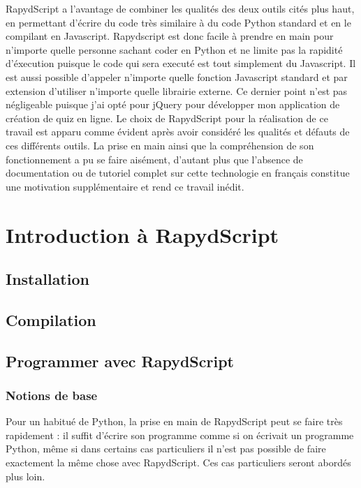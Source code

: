 \documentclass[letterpaper,10pt,french]{sphinxmanual}
\begin{document}
RapydScript a l'avantage de combiner les qualités des deux outils cités plus haut, en permettant d'écrire du code très similaire à du code Python standard et en le compilant en Javascript. Rapydscript est donc facile à prendre en main pour n'importe quelle personne sachant coder en Python et ne limite pas la rapidité d'éxecution puisque le code qui sera executé est tout simplement du Javascript. Il est aussi possible d'appeler n'importe quelle fonction Javascript standard et par extension d'utiliser n'importe quelle librairie externe. Ce dernier point n'est pas négligeable puisque j'ai opté pour jQuery pour développer mon application de création de quiz en ligne. Le choix de RapydScript pour la réalisation de ce travail est apparu comme évident après avoir considéré les qualités et défauts de ces différents outils. La prise en main ainsi que la compréhension de son fonctionnement a pu se faire aisément, d'autant plus que l'absence de documentation ou de tutoriel complet sur cette technologie en français constitue une motivation supplémentaire et rend ce travail inédit.


\section{Introduction à RapydScript}
\label{rapydscript:introduction-a-rapydscript}

\subsection{Installation}
\label{rapydscript:installation}

\subsection{Compilation}
\label{rapydscript:compilation}

\subsection{Programmer avec RapydScript}
\label{rapydscript:programmer-avec-rapydscript}

\subsubsection{Notions de base}
\label{rapydscript:notions-de-base}
Pour un habitué de Python, la prise en main de RapydScript peut se faire très rapidement : il suffit d'écrire son programme comme si on écrivait un programme Python, même si dans certains cas particuliers il n'est pas possible de faire exactement la même chose avec RapydScript. Ces cas particuliers seront abordés plus loin.
\end{document}
